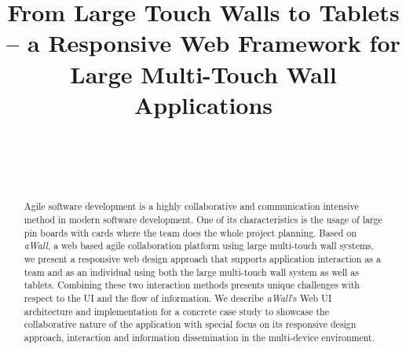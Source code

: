 \documentclass{sigchi}
\begin{document}
\title{From Large Touch Walls to Tablets -- a Responsive Web Framework for Large Multi-Touch Wall Applications}

\author{%
  \\
  \\
  \\
}

\maketitle



\begin{abstract}
Agile software development is a highly collaborative and communication intensive method in modern software development. 
One of its characteristics is the usage of large pin boards with cards where the team does the whole project planning. 
Based on \textit{aWall}, a web based agile collaboration platform using large multi-touch wall systems, we present a responsive web design approach that supports application interaction as a team and as an individual using both the large multi-touch wall system as well as tablets. 
Combining these two interaction methods presents unique challenges with respect to the UI and the flow of information. 
We describe \textit{aWall}'s Web UI architecture and implementation for a concrete case study to showcase the collaborative nature of the application with special focus on its responsive design approach, interaction and information dissemination in the multi-device environment.
\end{abstract}
\end{document}
